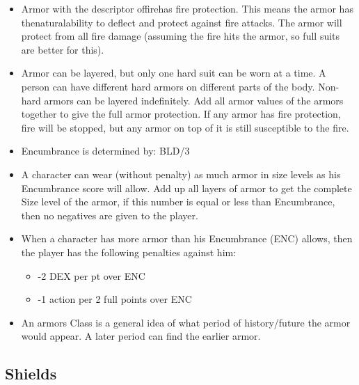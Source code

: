 \documentclass[twoside]{book}
\begin{document}
\begin{itemize}
  \item Armor with the descriptor offirehas fire protection. This means the armor has thenaturalability to deflect and protect against fire attacks. The armor will protect from all fire damage (assuming the fire hits the armor, so full suits are better for this).
  \item Armor can be layered, but only one hard suit can be worn at a time. A person can have different hard armors on different parts of the body. Non-hard armors can be layered indefinitely. Add all armor values of the armors together to give the full armor protection. If any armor has fire protection, fire will be stopped, but any armor on top of it is still susceptible to the fire.
  \item Encumbrance is determined by: BLD/3
  \item A character can wear (without penalty) as much armor in size levels as his Encumbrance score will allow. Add up all layers of armor to get the complete Size level of the armor, if this number is equal or less than Encumbrance, then no negatives are given to the player.
  \item When a character has more armor than his Encumbrance (ENC) allows, then the player has the following penalties against him:
\begin{itemize}
      
  \item -2 DEX per pt over ENC
  \item -1 action per 2 full points over ENC
\end{itemize}
  
  \item An armors Class is a general idea of what period of history/future the armor would appear. A later period can find the earlier armor.
\end{itemize}
  
    

\subsection{Shields}
    
\end{document}
